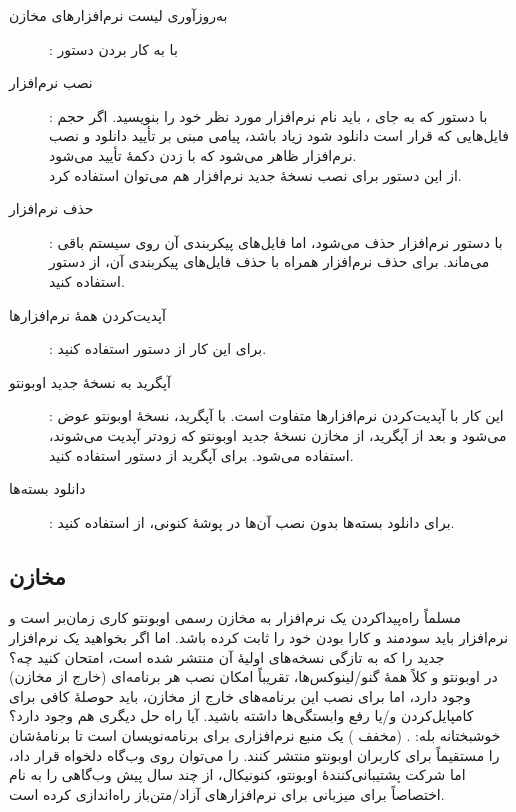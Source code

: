 \begin{description}
\item [به‌روزآوری لیست نرم‌افزارهای مخازن]: با به کار بردن دستور 
\item [نصب نرم‌افزار]: با دستور  که به جای ، باید نام نرم‌افزار مورد نظر خود را بنویسید. اگر حجم فایل‌هایی که قرار است دانلود شود زیاد باشد، پیامی مبنی بر تأیید دانلود و نصب نرم‌افزار ظاهر می‌شود که با زدن دکمهٔ  تأیید می‌شود.\\
از این دستور برای نصب نسخهٔ جدید نرم‌افزار هم می‌توان استفاده کرد.
\item [حذف نرم‌افزار]: با دستور  نرم‌افزار حذف می‌شود، اما فایل‌های پیکربندی آن روی سیستم باقی می‌ماند. برای حذف نرم‌افزار همراه با حذف فایل‌های پیکربندی آن، از دستور  استفاده کنید.
\item [آپدیت‌کردن همهٔ نرم‌افزارها]: برای این کار از دستور  استفاده کنید.
\item [آپگرید به نسخهٔ جدید اوبونتو]: این کار با آپدیت‌کردن نرم‌افزارها متفاوت است. با آپگرید، نسخهٔ اوبونتو عوض می‌شود و بعد از آپگرید، از مخازن نسخهٔ جدید اوبونتو که زودتر آپدیت می‌شوند، استفاده می‌شود. برای آپگرید از دستور  استفاده کنید.
\item [دانلود بسته‌ها]: برای دانلود بسته‌ها بدون نصب آن‌ها در پوشهٔ کنونی، از  استفاده کنید.
\end{description}

\subsection[مخازن ppa]{مخازن }
مسلماً راه‌پیداکردن یک نرم‌افزار به مخازن رسمی اوبونتو کاری زمان‌بر است و نرم‌افزار باید سودمند و کارا بودن خود را ثابت کرده باشد. اما اگر بخواهید یک نرم‌افزار جدید را که به تازگی نسخه‌های اولیهٔ آن منتشر شده است، امتحان کنید چه؟\\
در اوبونتو و کلاً همهٔ گنو/لینوکس‌ها، تقریباً امکان نصب هر برنامه‌ای (خارج از مخازن) وجود دارد، اما برای نصب این برنامه‌های خارج از مخازن، باید حوصلهٔ کافی برای کامپایل‌کردن و/یا رفع وابستگی‌ها داشته باشید. آیا راه حل دیگری هم وجود دارد؟\\
خوشبختانه بله: .  (مخفف ) یک منبع نرم‌افزاری برای برنامه‌نویسان است تا برنامهٔ‌شان را مستقیماً برای کاربران اوبونتو منتشر کنند.  را می‌توان روی وب‌گاه دلخواه قرار داد، اما شرکت پشتیبانی‌کنندهٔ اوبونتو، کنونیکال، از چند سال پیش وب‌گاهی را به نام \href{https://launchpad.net}{} اختصاصاً برای میزبانی  برای نرم‌افزارهای آزاد/متن‌باز راه‌اندازی کرده است.\\


